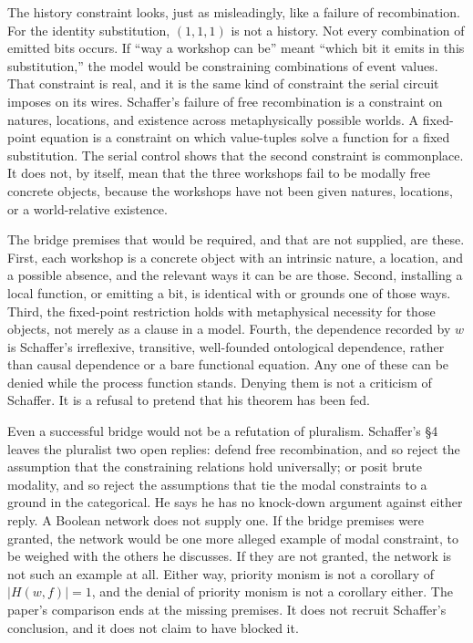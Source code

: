 \documentclass[12pt]{article}
\begin{document}
The history constraint looks, just as misleadingly, like a failure of recombination. For the identity substitution, \((1,1,1)\) is not a history. Not every combination of emitted bits occurs. If ``way a workshop can be'' meant ``which bit it emits in this substitution,'' the model would be constraining combinations of event values. That constraint is real, and it is the same kind of constraint the serial circuit imposes on its wires. Schaffer's failure of free recombination is a constraint on natures, locations, and existence across metaphysically possible worlds. A fixed-point equation is a constraint on which value-tuples solve a function for a fixed substitution. The serial control shows that the second constraint is commonplace. It does not, by itself, mean that the three workshops fail to be modally free concrete objects, because the workshops have not been given natures, locations, or a world-relative existence.

The bridge premises that would be required, and that are not supplied, are these. First, each workshop is a concrete object with an intrinsic nature, a location, and a possible absence, and the relevant ways it can be are those. Second, installing a local function, or emitting a bit, is identical with or grounds one of those ways. Third, the fixed-point restriction holds with metaphysical necessity for those objects, not merely as a clause in a model. Fourth, the dependence recorded by \(w\) is Schaffer's irreflexive, transitive, well-founded ontological dependence, rather than causal dependence or a bare functional equation. Any one of these can be denied while the process function stands. Denying them is not a criticism of Schaffer. It is a refusal to pretend that his theorem has been fed.

Even a successful bridge would not be a refutation of pluralism. Schaffer's \S 4 leaves the pluralist two open replies: defend free recombination, and so reject the assumption that the constraining relations hold universally; or posit brute modality, and so reject the assumptions that tie the modal constraints to a ground in the categorical. He says he has no knock-down argument against either reply. A Boolean network does not supply one. If the bridge premises were granted, the network would be one more alleged example of modal constraint, to be weighed with the others he discusses. If they are not granted, the network is not such an example at all. Either way, priority monism is not a corollary of \(|H(w,f)|=1\), and the denial of priority monism is not a corollary either. The paper's comparison ends at the missing premises. It does not recruit Schaffer's conclusion, and it does not claim to have blocked it.
\end{document}
